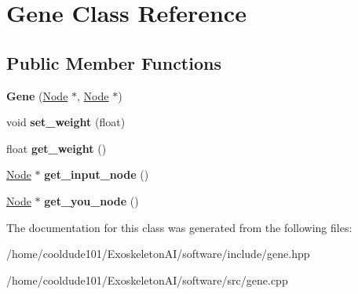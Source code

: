 \hypertarget{classGene}{}\section{Gene Class Reference}
\label{classGene}
\subsection*{Public Member Functions}
\begin{DoxyCompactItemize}
\item 
{\bfseries Gene} (\hyperlink{classNode}{Node} $\ast$, \hyperlink{classNode}{Node} $\ast$)\hypertarget{classGene_abacd374458e9a04430780c5feeb5006b}{}\label{classGene_abacd374458e9a04430780c5feeb5006b}

\item 
void {\bfseries set\+\_\+weight} (float)\hypertarget{classGene_aefc88f9e290c83c7e7434ed5cf36f240}{}\label{classGene_aefc88f9e290c83c7e7434ed5cf36f240}

\item 
float {\bfseries get\+\_\+weight} ()\hypertarget{classGene_a8d914163177d863dc21aac1ed0558970}{}\label{classGene_a8d914163177d863dc21aac1ed0558970}

\item 
\hyperlink{classNode}{Node} $\ast$ {\bfseries get\+\_\+input\+\_\+node} ()\hypertarget{classGene_a7dbcc3567c632f3e3e24a5ba869f9199}{}\label{classGene_a7dbcc3567c632f3e3e24a5ba869f9199}

\item 
\hyperlink{classNode}{Node} $\ast$ {\bfseries get\+\_\+you\+\_\+node} ()\hypertarget{classGene_aff0525f14e7feb09726f6ce2a3bdb31a}{}\label{classGene_aff0525f14e7feb09726f6ce2a3bdb31a}

\end{DoxyCompactItemize}


The documentation for this class was generated from the following files\+:\begin{DoxyCompactItemize}
\item 
/home/cooldude101/\+Exoskeleton\+A\+I/software/include/gene.\+hpp\item 
/home/cooldude101/\+Exoskeleton\+A\+I/software/src/gene.\+cpp\end{DoxyCompactItemize}
